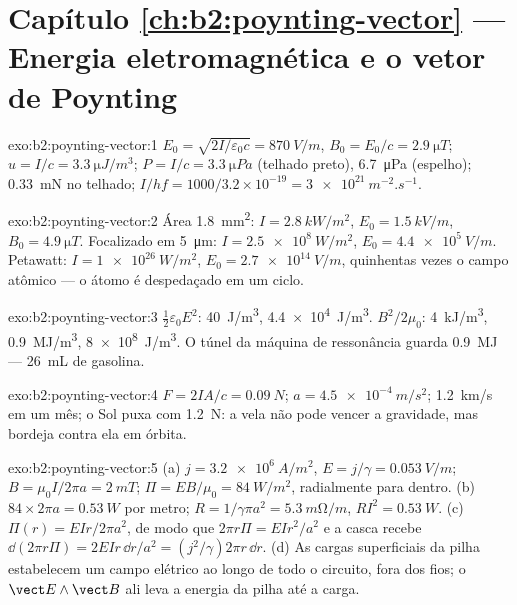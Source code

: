 \section*{Capítulo \ref{ch:b2:poynting-vector} --- Energia eletromagnética e o vetor de Poynting}

\begin{solution}{exo:b2:poynting-vector:1}
$E_0 = \sqrt{2I/\varepsilon_0c} = \qty{870}{V/m}$, $B_0 = E_0/c = \qty{2.9}{\micro T}$; $u = I/c
= \qty{3.3}{\micro J/m^3}$; $P = I/c = \qty{3.3}{\micro Pa}$ (telhado preto), \qty{6.7}{\micro Pa}
(espelho); \qty{0.33}{mN} no telhado; $I/hf = 1000/3.2 \times 10^{-19} = \qty{3e21}{m^{-2}.s^{-1}}$.
\end{solution}

\begin{solution}{exo:b2:poynting-vector:2}
Área \qty{1.8}{mm^2}: $I = \qty{2.8}{kW/m^2}$, $E_0 = \qty{1.5}{kV/m}$, $B_0 = \qty{4.9}{\micro T}$.
Focalizado em \qty{5}{\micro m}: $I = \qty{2.5e8}{W/m^2}$, $E_0 = \qty{4.4e5}{V/m}$. Petawatt:
$I = \qty{1e26}{W/m^2}$, $E_0 = \qty{2.7e14}{V/m}$, quinhentas vezes o campo
atômico --- o átomo é despedaçado em um ciclo.
\end{solution}

\begin{solution}{exo:b2:poynting-vector:3}
$\tfrac12\varepsilon_0E^2$: \qty{40}{J/m^3}, \qty{4.4e4}{J/m^3}. $B^2/2\mu_0$: \qty{4}{kJ/m^3},
\qty{0.9}{MJ/m^3}, \qty{8e8}{J/m^3}. O túnel da máquina de ressonância guarda \qty{0.9}{MJ} --- \qty{26}{mL}
de gasolina.
\end{solution}

\begin{solution}{exo:b2:poynting-vector:4}
$F = 2IA/c = \qty{0.09}{N}$; $a = \qty{4.5e-4}{m/s^2}$; \qty{1.2}{km/s} em um mês;
o Sol puxa com \qty{1.2}{N}: a vela não pode vencer a gravidade, mas bordeja
contra ela em órbita.
\end{solution}

\begin{solution}{exo:b2:poynting-vector:5}
(a) $j = \qty{3.2e6}{A/m^2}$, $E = j/\gamma = \qty{0.053}{V/m}$; $B = \mu_0I/2\pi a = \qty{2}{mT}$;
$\Pi = EB/\mu_0 = \qty{84}{W/m^2}$, radialmente para dentro. (b) $84 \times 2\pi a = \qty{0.53}{W}$
por metro; $R = 1/\gamma\pi a^2 = \qty{5.3}{m\ohm/m}$, $RI^2 = \qty{0.53}{W}$. (c) $\Pi(r)
= EIr/2\pi a^2$, de modo que $2\pi r\Pi = EIr^2/a^2$ e a casca recebe $\dd(2\pi r\Pi)
= 2EIr\,\dd r/a^2 = (j^2/\gamma)2\pi r\,\dd r$. (d) As cargas superficiais da pilha
estabelecem um campo elétrico ao longo de todo o circuito, fora dos fios;
o $\vect E\wedge\vect B$ ali leva a energia da pilha até a carga.
\end{solution}

